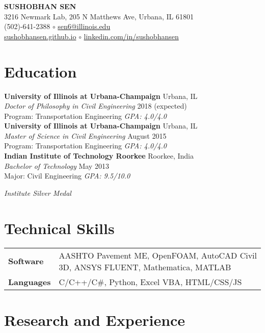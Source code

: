 \documentclass[12pt]{article}
\begin{document}
\begin{center}
{\huge \uppercase{\textbf{Sushobhan Sen}}} \\
3216 Newmark Lab, 205 N Matthews Ave, Urbana, IL 61801 \\
(502)-641-2388 $\circ$ \href{mailto:sen6@illinois.edu}{sen6@illinois.edu} \\
\href{http://sushobhansen.github.io/}{sushobhansen.github.io} $\circ$ \href{http://linkedin.com/in/sushobhansen}{linkedin.com/in/sushobhansen}
\end{center} 

\hfill \break
\section*{Education}
\textbf{University of Illinois at Urbana-Champaign} \hfill Urbana, IL\\
\textit{Doctor of Philosophy in Civil Engineering} \hfill 2018 (expected)\\
Program: Transportation Engineering \hfill \textit{GPA: 4.0/4.0} \\

\textbf{University of Illinois at Urbana-Champaign} \hfill Urbana, IL\\
\textit{Master of Science in Civil Engineering} \hfill August 2015\\
Program: Transportation Engineering \hfill \textit{GPA: 4.0/4.0} \\

\textbf{Indian Institute of Technology Roorkee} \hfill Roorkee, India\\
\textit{Bachelor of Technology} \hfill May 2013\\
Major: Civil Engineering \hfill \textit{GPA: 9.5/10.0} \\
\strut \hfill \textit{Institute Silver Medal} \\

\section*{Technical Skills}
\begin{tabular}{p{10em} p{25em}}
\textbf{Software} & AASHTO Pavement ME, OpenFOAM, AutoCAD Civil 3D, ANSYS FLUENT, Mathematica, MATLAB \\
\textbf{Languages} & C/C++/C\#, Python, Excel VBA, HTML/CSS/JS
\end{tabular}

\section*{Research and Experience}
\end{document}
